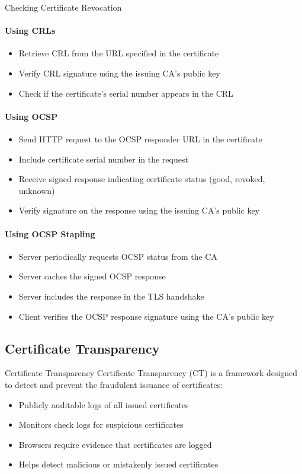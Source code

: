 \begin{KR}{Checking Certificate Revocation}
\paragraph{Using CRLs}
\begin{itemize}
    \item Retrieve CRL from the URL specified in the certificate
    \item Verify CRL signature using the issuing CA's public key
    \item Check if the certificate's serial number appears in the CRL
\end{itemize}

\paragraph{Using OCSP}
\begin{itemize}
    \item Send HTTP request to the OCSP responder URL in the certificate
    \item Include certificate serial number in the request
    \item Receive signed response indicating certificate status (good, revoked, unknown)
    \item Verify signature on the response using the issuing CA's public key
\end{itemize}

\paragraph{Using OCSP Stapling}
\begin{itemize}
    \item Server periodically requests OCSP status from the CA
    \item Server caches the signed OCSP response
    \item Server includes the response in the TLS handshake
    \item Client verifies the OCSP response signature using the CA's public key
\end{itemize}
\end{KR}

\subsection{Certificate Transparency}

\begin{concept}{Certificate Transparency}
Certificate Transparency (CT) is a framework designed to detect and prevent the fraudulent issuance of certificates:
\begin{itemize}
    \item Publicly auditable logs of all issued certificates
    \item Monitors check logs for suspicious certificates
    \item Browsers require evidence that certificates are logged
    \item Helps detect malicious or mistakenly issued certificates
\end{itemize}
\end{concept}

